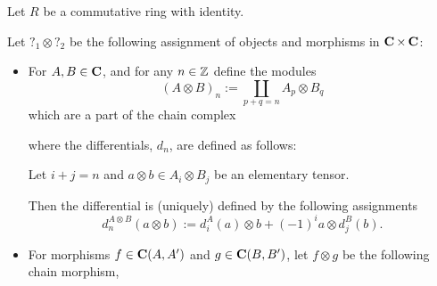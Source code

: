 \begin{definition}
    \label{def:tensor_product_of_chain_complexes_over_Mod(R)}
    Let \( R \) be a commutative ring with identity.
    
    Let \( ?_1 \otimes ?_2 \) be the following assignment of objects and morphisms in \( \operatorname{\mathbf{C}} \times \operatorname{\mathbf{C}} \):
    \begin{itemize}
        \item {
            For \( A, B \in \operatorname{\mathbf{C}} \), and for any  \( n \in {\mathbb{Z}} \) define the modules
            \[
                (A \otimes B)_n := \coprod_{p + q = n} A_p \otimes B_q
            \]
            which are a part of the chain complex
            \begin{center}
            \end{center}
            where the differentials, \( d_n \), are defined as follows:
            
            Let \( i + j = n \) and \( a \otimes b \in A_i \otimes B_j \) be an elementary tensor.

            Then the differential is (uniquely) defined by the following assignments
            \[
                d_n^{A \otimes B}(a \otimes b) := d_i^A(a) \otimes b + (-1)^{i} a \otimes d_j^B(b).
            \]
        }
        \item {
            For morphisms \( f \in \operatorname{\mathbf{C}}(A, A') \) and \( g \in \operatorname{\mathbf{C}}(B, B') \), let \( f \otimes g \) be the following chain morphism,
            \begin{center}
\end{center}}
\end{itemize}
\end{definition}
